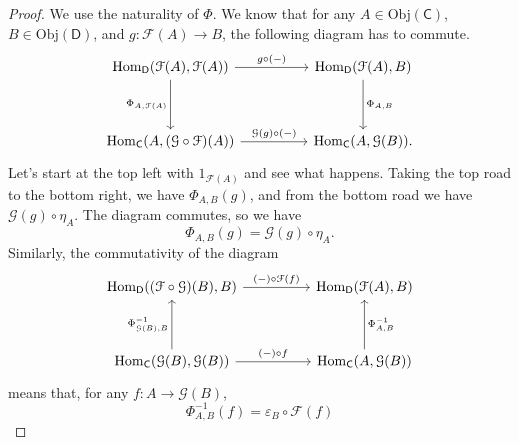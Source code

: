 \documentclass[a4paper,10pt]{scrreprt}
\newcommand{\Obj}{\mathrm{Obj}}
\newcommand{\Hom}{\mathrm{Hom}}
\theoremstyle{definition}
\theoremstyle{plain}
\theoremstyle{remark}
\begin{document}
\begin{proof}
  We use the naturality of $\Phi$. We know that for any $A \in \Obj(\mathsf{C})$, $B \in \Obj(\mathsf{D})$, and $g\colon \mathcal{F}(A) \to B$, the following diagram has to commute.
  \begin{equation*}
    \begin{tikzcd}[row sep=huge, column sep=huge]
      \Hom_{\mathsf{D}}(\mathcal{F}(A), \mathcal{F}(A))
      \arrow[r, "g \circ (-)"]
      \arrow[d, swap, "\Phi_{A, \mathcal{F}(A)}"]
      & \Hom_{\mathsf{D}}(\mathcal{F}(A), B)
      \arrow[d, "\Phi_{A, B}"]
      \\
      \Hom_{\mathsf{C}}(A, (\mathcal{G} \circ \mathcal{F})(A))
      \arrow[r, "\mathcal{G}(g) \circ (-)"]
      & \Hom_{\mathsf{C}}(A, \mathcal{G}(B)).
    \end{tikzcd}
  \end{equation*}
  Let's start at the top left with $1_{\mathcal{F}(A)}$ and see what happens. Taking the top road to the bottom right, we have $\Phi_{A, B}(g)$, and from the bottom road we have $\mathcal{G}(g) \circ \eta_{A}$. The diagram commutes, so we have
  \begin{equation*}
    \Phi_{A, B}(g) = \mathcal{G}(g) \circ \eta_{A}.
  \end{equation*}
  Similarly, the commutativity of the diagram
  \begin{equation*}
    \begin{tikzcd}[row sep=huge, column sep=huge]
      \Hom_{\mathsf{D}}((\mathcal{F} \circ \mathcal{G})(B), B)
      \arrow[r, "(-) \circ \mathcal{F}(f)"]
      & \Hom_{\mathsf{D}}(\mathcal{F}(A), B)
      \\
      \Hom_{\mathsf{C}}(\mathcal{G}(B), \mathcal{G}(B))
      \arrow[r, "(-) \circ f"]
      \arrow[u, "{\Phi^{-1}_{\mathcal{G}(B), B}}"]
      & \Hom_{\mathsf{C}}(A, \mathcal{G}(B))
      \arrow[u, swap, "\Phi^{-1}_{A, B}"]
    \end{tikzcd}
  \end{equation*}
  means that, for any $f\colon A \to \mathcal{G}(B)$,
  \begin{equation*}
    \Phi^{-1}_{A, B}(f) = \varepsilon_{B} \circ \mathcal{F}(f) 
  \end{equation*}


\end{proof}
\end{document}

